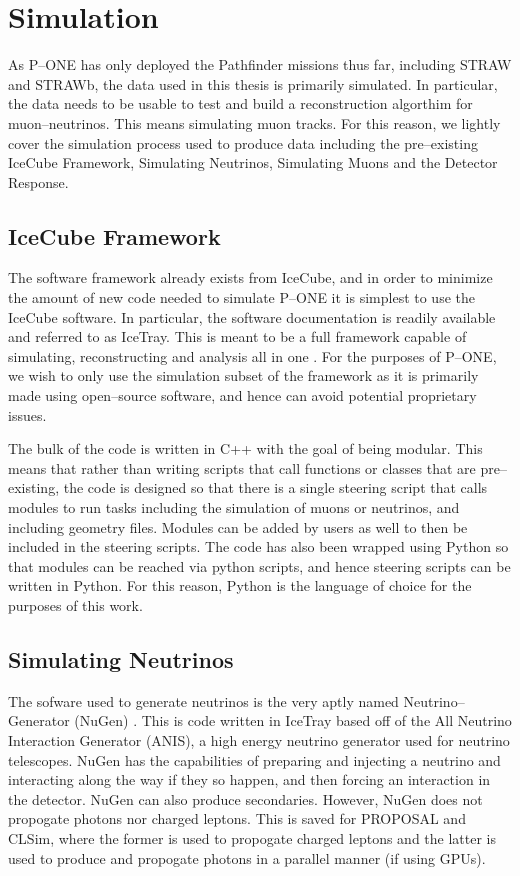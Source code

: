 \chapter{Simulation}

As P--ONE has only deployed the Pathfinder missions thus far, including STRAW and STRAWb, the data used in this thesis is primarily simulated. In particular, the data needs to be usable to test and build a reconstruction algorthim for muon--neutrinos. This means simulating muon tracks. For this reason, we lightly cover the simulation process used to produce data including the pre--existing IceCube Framework, Simulating Neutrinos, Simulating Muons and the Detector Response. 

\section{IceCube Framework}

The software framework already exists from IceCube, and in order to minimize the amount of new code needed to simulate P--ONE it is simplest to use the IceCube software. In particular, the software documentation is readily available \cite{icetray} and referred to as IceTray. This is meant to be a full framework capable of simulating, reconstructing and analysis all in one \cite{icetray}. For the purposes of P--ONE, we wish to only use the simulation subset of the framework as it is primarily made using open--source software, and hence can avoid potential proprietary issues.

The bulk of the code is written in C++ with the goal of being modular. This means that rather than writing scripts that call functions or classes that are pre--existing, the code is designed so that there is a single steering script that calls modules to run tasks including the simulation of muons or neutrinos, and including geometry files. Modules can be added by users as well to then be included in the steering scripts. The code has also been wrapped using Python so that modules can be reached via python scripts, and hence steering scripts can be written in Python. For this reason, Python is the language of choice for the purposes of this work.

\section{Simulating Neutrinos}

The sofware used to generate neutrinos is the very aptly named Neutrino--Generator (NuGen) \cite{icetray}. This is code written in IceTray based off of the All Neutrino Interaction Generator (ANIS), a high energy neutrino generator used for neutrino telescopes. NuGen has the capabilities of preparing and injecting a neutrino and interacting along the way if they so happen, and then forcing an interaction in the detector. NuGen can also produce secondaries. However, NuGen does not propogate photons nor charged leptons. This is saved for PROPOSAL and CLSim, where the former is used to propogate charged leptons and the latter is used to produce and propogate photons in a parallel manner (if using GPUs). 

